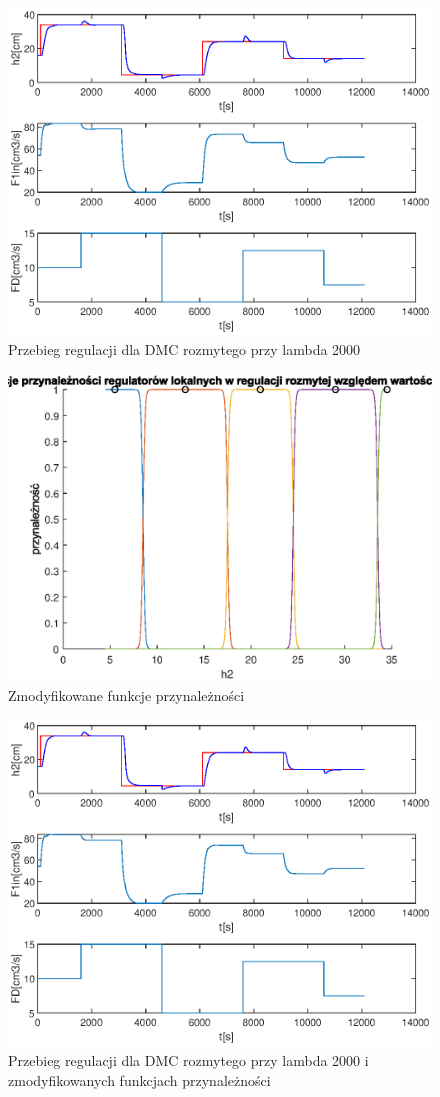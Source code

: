 		\begin{figure}[h!]
			\includegraphics[width=0.9\linewidth]{plots/z2_dmc2000oryg.eps}
			\caption{Przebieg regulacji dla DMC rozmytego przy lambda 2000}
			\label{rys:dmcoryg}
		\end{figure}
		\begin{figure}[h!]
			\includegraphics[width=0.85\linewidth]{plots/z2_dmcprzyn.eps}
			\caption{Zmodyfikowane funkcje przynależności}
			\label{rys:dmcprzyn}
		\end{figure}
		\begin{figure}[h!]
			\includegraphics[width=0.9\linewidth]{plots/z2_dmc2000.eps}
			\caption{Przebieg regulacji dla DMC rozmytego przy lambda 2000 i zmodyfikowanych funkcjach przynależności}
			\label{rys:dmcroz2000}
		\end{figure}
